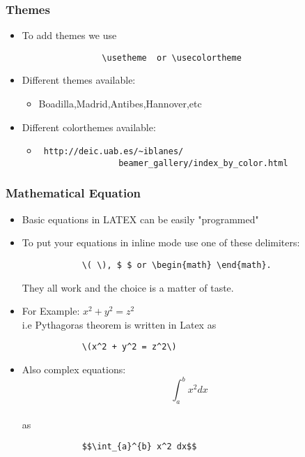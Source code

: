 \documentclass{beamer}
\begin{document}
	\begin{frame}[fragile]
		\frametitle{Themes}
		\begin{Large}
		\begin{itemize}
			\item To add themes we use\\\Large
			\begin{verbatim}
				\usetheme  or \usecolortheme
			\end{verbatim}
			\item Different themes available:
				\begin{itemize}
				\item Boadilla,Madrid,Antibes,Hannover,etc
				\end{itemize}
			\item Different colorthemes available:
				\begin{itemize}
				\item \begin{verbatim} http://deic.uab.es/~iblanes/
				beamer_gallery/index_by_color.html 
				\end{verbatim}
				\end{itemize}		
		\end{itemize}
		\end{Large}
	\end{frame}
	\begin{frame}[fragile]
		\frametitle{Mathematical Equation}
		\begin{Large}
		\begin{itemize}
			\item Basic equations in LATEX can be easily "programmed"
			\item To put your equations in inline mode use one of these delimiters:
			\begin{verbatim}
			\( \), $ $ or \begin{math} \end{math}.
			\end{verbatim}
			They all work and the choice is a matter of taste.
			
		\end{itemize}
		\end{Large}
	\end{frame}
	\begin{frame}[fragile]
		\begin{Large}
		\begin{itemize}
			\item For Example:
			\(x^2 + y^2 = z^2\) \\
			i.e Pythagoras theorem is written in Latex as \\
			\begin{verbatim}
			\(x^2 + y^2 = z^2\)
			\end{verbatim}
			\item Also complex equations:
			$$\int_{a}^{b} x^2 dx$$ \\ as \\
			\begin{verbatim}
			$$\int_{a}^{b} x^2 dx$$
			\end{verbatim}
		\end{itemize}
		\end{Large}
	\end{frame}
\end{document}
